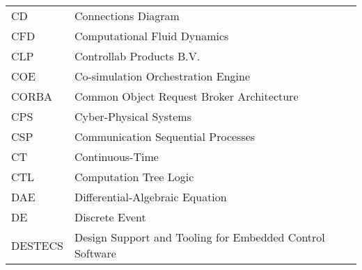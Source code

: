 \begin{longtable}{ll}
CD & Connections Diagram \\
CFD & Computational Fluid Dynamics\\
CLP	&Controllab Products B.V. \\
COE & Co-simulation Orchestration Engine \\
CORBA & Common Object Request Broker Architecture \\
CPS     & Cyber-Physical Systems\\
CSP	&Communication Sequential Processes\\
CT	&Continuous-Time\\
CTL & Computation Tree Logic \\
DAE & Differential-Algebraic Equation \\
DE      &Discrete Event\\
DESTECS	&Design Support and Tooling for Embedded Control Software\\

\end{longtable}
